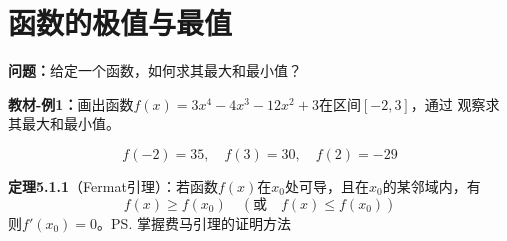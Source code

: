 \section{函数的极值与最值}

{\bf 问题：}给定一个函数，如何求其最大和最小值？

{\bf 教材-例1：}画出函数$f(x)=3x^4-4x^3-12x^2+3$在区间$[-2,3]$，通过
观察求其最大和最小值。

\begin{center}
\end{center}
\vspace{-2em}
$$f(-2)=35,\quad f(3)=30,\quad f(2)=-29$$

{\bf 定理5.1.1}（Fermat引理）：若函数$f(x)$在$x_0$处可导，且在$x_0$的某邻域内，有
$$f(x)\geq f(x_0)\quad (\mbox{或}\quad f(x)\leq f(x_0))$$
则$f'(x_0)=0$。\ps{掌握费马引理的证明方法}

